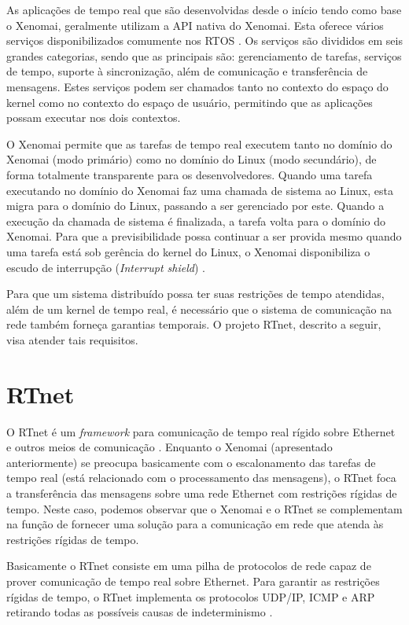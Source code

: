 	As aplicações de tempo real que são desenvolvidas desde o início tendo como base o Xenomai, geralmente utilizam a API nativa \cite{XENO_API06} do Xenomai. Esta oferece vários serviços disponibilizados comumente nos RTOS \cite{VERGO01} \cite{KALINSKY03}. Os serviços são divididos em seis grandes categorias, sendo que as principais são: gerenciamento de tarefas, serviços de tempo, suporte à sincronização, além de comunicação e transferência de mensagens. Estes serviços podem ser chamados tanto no contexto do espaço do kernel como no contexto do espaço de usuário, permitindo que as aplicações possam executar nos dois contextos.
	
	O Xenomai permite que as tarefas de tempo real executem tanto no domínio do Xenomai (modo primário) como no domínio do Linux (modo secundário), de forma totalmente transparente para os desenvolvedores. Quando uma tarefa executando no domínio do Xenomai faz uma chamada de sistema ao Linux, esta migra para o domínio do Linux, passando a ser gerenciado por este. Quando a execução da chamada de sistema é finalizada, a tarefa volta para o domínio do Xenomai. Para que a previsibilidade possa continuar a ser provida mesmo quando uma tarefa está sob gerência do kernel do Linux, o Xenomai disponibiliza o escudo de interrupção (\textit{Interrupt shield}) \cite{XENO_API06}.
	
	Para que um sistema distribuído possa ter suas restrições de tempo atendidas, além de um kernel de tempo real, é necessário que o sistema de comunicação na rede também forneça garantias temporais. O projeto RTnet, descrito a seguir, visa atender tais requisitos.
	
\section{RTnet}

	O RTnet é um \textit{framework} para comunicação de tempo real rígido sobre Ethernet e outros meios de comunicação \cite{KWZB05}. Enquanto o Xenomai (apresentado anteriormente) se preocupa basicamente com o escalonamento das tarefas de tempo real (está relacionado com o processamento das mensagens), o RTnet foca a transferência das mensagens sobre uma rede Ethernet com restrições rígidas de tempo. Neste caso, podemos observar que o Xenomai e o RTnet se complementam na função de fornecer uma solução para a comunicação em rede que atenda às restrições rígidas de tempo.
	
	Basicamente o RTnet consiste em uma pilha de protocolos de rede capaz de prover comunicação de tempo real sobre Ethernet. Para garantir as restrições rígidas de tempo, o RTnet implementa os protocolos UDP/IP, ICMP e ARP retirando todas as possíveis causas de indeterminismo \cite{KWZB05}.
	
